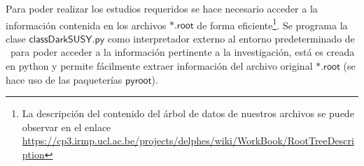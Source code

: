 

Para poder realizar los estudios requeridos se hace necesario acceder a la información contenida en los archivos $\textsf{*.root}$ de forma eficiente\footnote{La descripción del contenido del árbol de datos de nuestros archivos se puede observar en el enlace \href{https://cp3.irmp.ucl.ac.be/projects/delphes/wiki/WorkBook/RootTreeDescription}{https://\-cp3.\-irmp.\-ucl.\-ac.\-be/\-pro\-jects/\-delphes/\-wiki/\-Work\-Book/\-Root\-Tree\-Des\-crip\-tion}}. Se programa la clase $\textsf{classDarkSUSY.py}$ como interpretador externo al entorno predeterminado de \ROOT ~para poder acceder a la información pertinente a la investigación, está es creada en python y permite fácilmente extraer información del archivo original $\textsf{*.root}$ (se hace uso de las paqueterías $\textsf{pyroot}$). %

